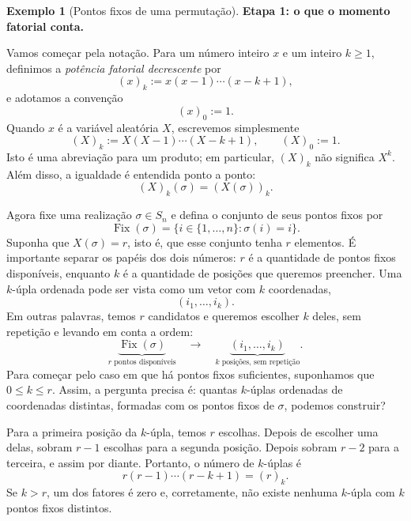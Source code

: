 \documentclass[12pt,portuguese]{article}
\theoremstyle{definition}
\newtheorem{example}[example]{Exemplo}
\theoremstyle{plainexercise}
\theoremstyle{starredexercise}
\theoremstyle{definition}
\begin{document}
\begin{example}[Pontos fixos de uma permutação]
\medskip
\noindent\textbf{Etapa 1: o que o momento fatorial conta.}

Vamos começar pela notação. Para um número inteiro $x$ e um inteiro
$k\geqslant1$, definimos a \emph{potência fatorial decrescente} por
\[
(x)_k:=x(x-1)\cdots(x-k+1),
\]
e adotamos a convenção
\[
(x)_0:=1.
\]
Quando $x$ é a variável aleatória $X$, escrevemos simplesmente
\[
(X)_k:=X(X-1)\cdots(X-k+1),
\qquad (X)_0:=1.
\]
Isto é uma abreviação para um produto; em particular, $(X)_k$ não significa
$X^k$. Além disso, a igualdade é entendida ponto a ponto:
\[
(X)_k(\sigma)=(X(\sigma))_k.
\]

Agora fixe uma realização $\sigma\in S_n$ e defina o conjunto de seus pontos
fixos por
\[
\operatorname{Fix}(\sigma)=\{i\in\{1,\ldots,n\}:\sigma(i)=i\}.
\]
Suponha que $X(\sigma)=r$, isto é, que esse conjunto tenha $r$ elementos.
É importante separar os papéis dos dois números: $r$ é a quantidade de
pontos fixos disponíveis, enquanto $k$ é a quantidade de posições que
queremos preencher. Uma $k$-úpla ordenada pode ser vista como um vetor com
$k$ coordenadas,
\[
(i_1,\ldots,i_k).
\]
Em outras palavras, temos $r$ candidatos e queremos escolher $k$ deles,
sem repetição e levando em conta a ordem:
\[
\underbrace{\operatorname{Fix}(\sigma)}_{r\text{ pontos disponíveis}}
\quad\longrightarrow\quad
\underbrace{(i_1,\ldots,i_k)}_{k\text{ posições, sem repetição}}.
\]
Para começar pelo caso em que há pontos fixos suficientes, suponhamos que
$0\leqslant k\leqslant r$. Assim, a pergunta precisa é: quantas $k$-úplas
ordenadas de coordenadas distintas, formadas com os pontos fixos de
$\sigma$, podemos construir?

Para a primeira posição da $k$-úpla, temos $r$ escolhas. Depois de escolher uma
delas, sobram $r-1$ escolhas para a segunda posição. Depois sobram $r-2$ para
a terceira, e assim por diante. Portanto, o número de $k$-úplas é
\[
r(r-1)\cdots(r-k+1)=(r)_k.
\]
Se $k>r$, um dos fatores é zero e, corretamente, não existe nenhuma
$k$-úpla com $k$ pontos fixos distintos.


\end{example}
\end{document}
